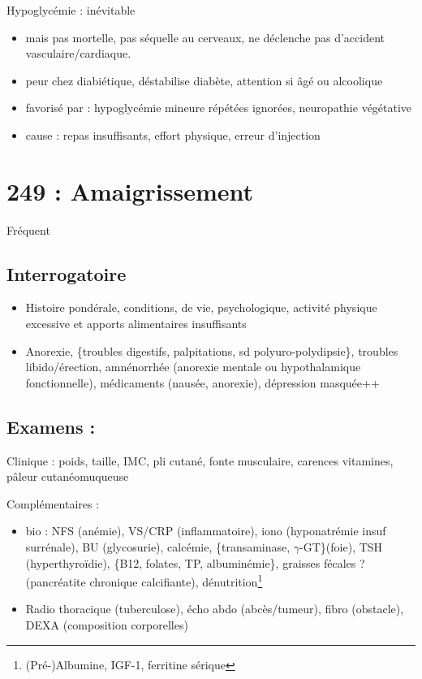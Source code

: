 \documentclass[11pt]{article}
\begin{document}
Hypoglycémie : inévitable 
\begin{itemize}
\item mais pas mortelle, pas séquelle au cerveaux, ne déclenche pas d'accident vasculaire/cardiaque.
\item peur chez diabiétique, déstabilise diabète, attention si âgé ou alcoolique
\item favorisé par : hypoglycémie mineure répétées ignorées, neuropathie végétative
\item cause : repas insuffisants, effort physique, erreur d'injection
\end{itemize}
\section{249 : Amaigrissement}
\label{sec:orgdc910a7}
Fréquent

\subsection{Interrogatoire}
\label{sec:org0d7c1be}
\begin{itemize}
\item Histoire pondérale, conditions, de vie, psychologique, activité physique excessive et apports alimentaires insuffisants
\item Anorexie, \{troubles digestifs, palpitations, sd polyuro-polydipsie\}, troubles
libido/érection, amnénorrhée (anorexie mentale ou hypothalamique
fonctionnelle), médicaments (nausée, anorexie), dépression masquée++
\end{itemize}

\subsection{Examens :}
\label{sec:orgc9f8c39}
Clinique : poids, taille, IMC, pli cutané, fonte musculaire, carences vitamines,
pâleur cutanéomuqueuse

Complémentaires :
\begin{itemize}
\item bio : NFS (anémie), VS/CRP (inflammatoire), iono (hyponatrémie \thus insuf
surrénale), BU (glycosurie), calcémie, \{transaminase, \(\gamma\)-GT\}(foie), TSH
(hyperthyroïdie), \{B12, folates, TP, albuminémie\}, graisses fécales ?
(pancréatite chronique calcifiante), dénutrition\footnote{(Pré-)Albumine, IGF-1, ferritine sérique}
\item Radio thoracique (tuberculose), écho abdo (abcès/tumeur), fibro (obstacle),
DEXA (composition corporelles)
\end{itemize}
\end{document}
